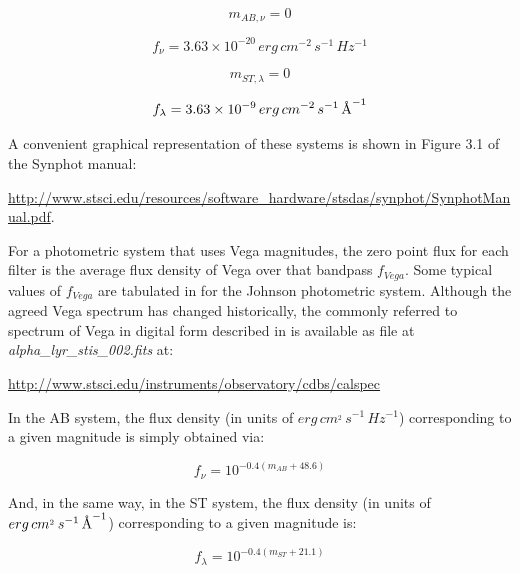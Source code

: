 \documentclass[11pt,a4paper]{ivoa}
\newcommand{\angstrom}{\mbox{\normalfont\AA}}
\begin{document}
\begin{equation} \label{eq:7_0}
m_{AB,\nu } = 0
\end{equation}

\begin{equation} \label{eq:8}
f_\nu = 3.63\times 10^{-20}\,erg\,cm^{-2}\,s^{-1}\,Hz^{-1}
\end{equation}

\begin{equation} \label{eq:9}
m_{ST,\lambda } = 0
\end{equation}

\begin{equation} \label{eq:10}
f_\lambda = 3.63\times 10^{-9}\,erg\,cm^{-2}\,s^{-1}\,\angstrom^{-1}
\end{equation}


A convenient graphical representation of these systems is shown in 
Figure 3.1 of the Synphot manual:

\url{http://www.stsci.edu/resources/software_hardware/stsdas/synphot/SynphotManual.pdf}.
\par

For a photometric system that uses Vega magnitudes, the zero point 
flux for each filter is the average flux density of Vega over that 
bandpass $f_{Vega}$. Some typical values of $f_{Vega}$ are tabulated in 
\citep{2001eaa..book.....M} for the Johnson photometric system. Although 
the agreed Vega spectrum has changed historically, the commonly referred to 
spectrum of Vega in digital form described in \citep{2004AJ....127.3508B} 
is available as file at \emph{alpha\_lyr\_stis\_002.fits} at:\par
\url{http://www.stsci.edu/instruments/observatory/cdbs/calspec}
\par

In the AB system, the flux density (in units of $erg\, cm^{_2}\, s^{-1}\, Hz^{-1}$) 
corresponding to a given magnitude is simply obtained via:

\begin{equation} \label{eq:11}
f_{\nu} = 10^{-0.4(m_{AB}+48.6)}
\end{equation}

And, in the same way, in the ST system, the flux density (in units of $erg\, 
cm^{_2}\, s^{-1}\, \angstrom^{-1}$) corresponding to a given magnitude is:

\begin{equation} \label{eq:12}
f_{\lambda} = 10^{-0.4(m_{ST}+21.1)}
\end{equation}
\end{document}
